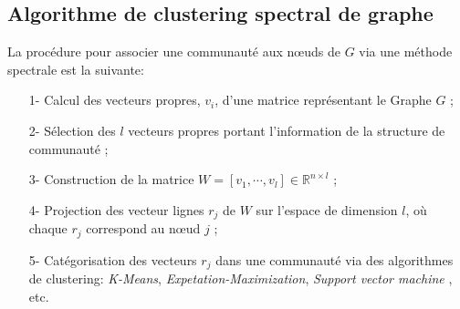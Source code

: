 \subsection{Algorithme de clustering spectral de graphe}
 \label{par:algo spectral clustering}
La procédure pour associer une communauté aux nœuds de $G$ via une méthode spectrale est la suivante: 
\begin{itemize}
	\item[1-] Calcul des vecteurs propres, $v_i$, d'une matrice représentant le Graphe $G$ ;
	\item[2-] Sélection des $l$ vecteurs propres portant l'information de la structure de communauté ; 
	\item[3-] Construction de la matrice $W = [v_1, \cdots, v_l] \in \mathbb{R}^{n\times l}$ ; 
	\item[4-] Projection des vecteur lignes $r_j$ de $W$ sur l'espace de dimension $l$, où chaque $r_j$ correspond  au nœud $j$ ; 
	\item[5-] Catégorisation des vecteurs $r_j $ dans une communauté via des algorithmes de clustering: \textit{K-Means}, \textit{Expetation-Maximization}, \textit{Support vector machine }, etc.\\
\end{itemize}

